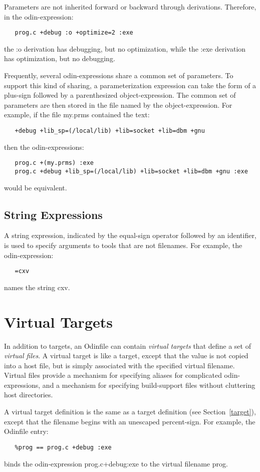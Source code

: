 Parameters are not inherited forward or backward through derivations.
Therefore, in the odin-expression:
\begin{verbatim}
   prog.c +debug :o +optimize=2 :exe
\end{verbatim}
the {\ex :o} derivation has debugging, but no optimization,
while the {\ex :exe} derivation has optimization, but no debugging.

Frequently, several odin-expressions share a common set of parameters.
To support this kind of sharing,
a parameterization expression can take the form of
a plus-sign followed by a parenthesized object-expression.
The common set of parameters are then stored in the file
named by the object-expression.
For example, if the file {\ex my.prms} contained the text:
\begin{verbatim}
   +debug +lib_sp=(/local/lib) +lib=socket +lib=dbm +gnu
\end{verbatim}
then the odin-expressions:
\begin{verbatim}
   prog.c +(my.prms) :exe
   prog.c +debug +lib_sp=(/local/lib) +lib=socket +lib=dbm +gnu :exe
\end{verbatim}
would be equivalent.

\subsection{String Expressions}

A string expression, indicated by the equal-sign operator
followed by an identifier,
is used to specify arguments to tools that are not filenames.
For example, the odin-expression:
\begin{verbatim}
   =cxv
\end{verbatim}
names the string {\ex cxv}.


\section{Virtual Targets}
\label{virtualtarget}

In addition to targets,
an {\ex Odinfile} can contain {\em virtual targets}
that define a set of {\em virtual files}.
A virtual target is like a target,
except that the value is not copied into a host file,
but is simply associated with the specified virtual filename.
Virtual files provide a mechanism for specifying aliases
for complicated odin-expressions,
and a mechanism for specifying build-support files without cluttering
host directories.

A virtual target definition is the same as a target definition
(see Section~\ref{target}),
except that the filename begins with an unescaped percent-sign.
For example, the {\ex Odinfile} entry:
\begin{verbatim}
   %prog == prog.c +debug :exe
\end{verbatim}
binds the odin-expression {\ex prog.c+debug:exe}
to the virtual filename {\ex prog}.

